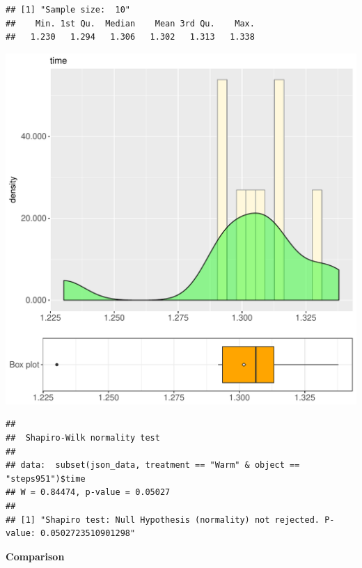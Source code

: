 \documentclass{article}\usepackage[]{graphicx}\usepackage[]{color}
\makeatletter
\def\maxwidth{ %
  \ifdim\Gin@nat@width>\linewidth
    \linewidth
  \else
    \Gin@nat@width
  \fi
}
\newenvironment{kframe}{%
 \def\at@end@of@kframe{}%
 \ifinner\ifhmode%
  \def\at@end@of@kframe{\end{minipage}}%
  \begin{minipage}{\columnwidth}%
 \fi\fi%
 \def\FrameCommand##1{\hskip\@totalleftmargin \hskip-\fboxsep
 \colorbox{shadecolor}{##1}\hskip-\fboxsep
     \hskip-\linewidth \hskip-\@totalleftmargin \hskip\columnwidth}%
 \MakeFramed {\advance\hsize-\width
   \@totalleftmargin\z@ \linewidth\hsize
   \@setminipage}}%
 {\par\unskip\endMakeFramed%
 \at@end@of@kframe}
\newenvironment{knitrout}{}{} %
\makeatother
\begin{document}
\begin{knitrout}
\color{fgcolor}\begin{kframe}
\begin{verbatim}
## [1] "Sample size:  10"
##    Min. 1st Qu.  Median    Mean 3rd Qu.    Max. 
##   1.230   1.294   1.306   1.302   1.313   1.338
\end{verbatim}
\end{kframe}
\includegraphics[width=\maxwidth]{figure/RH1_Warm_steps951-1} 
\begin{kframe}\begin{verbatim}
## 
## 	Shapiro-Wilk normality test
## 
## data:  subset(json_data, treatment == "Warm" & object == "steps951")$time
## W = 0.84474, p-value = 0.05027
## 
## [1] "Shapiro test: Null Hypothesis (normality) not rejected. P-value: 0.0502723510901298"
\end{verbatim}
\end{kframe}
\end{knitrout}
  
 \textbf{Comparison}
  
\end{document}
